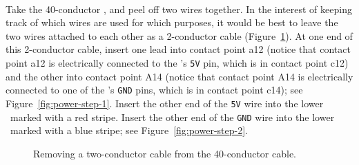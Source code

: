 \disconnect\

Take the 40-conductor \rainbow, and peel off two wires together. In the
interest of keeping track of which wires are used for which purposes, it would
be best to leave the two wires attached to each other as a 2-conductor cable
(Figure~\ref{fig:two-wires}). At one end of this 2-conductor cable, insert one
lead into contact point a12 (notice that contact point a12 is electrically
connected to the \nano's \texttt{5V} pin, which is in contact point c12) and
the other into contact point A14 (notice that contact point A14 is electrically
connected to one of the \nano's \texttt{GND} pins, which is in contact point
c14); see Figure~\ref{fig:power-step-1}. Insert the other end of the
\texttt{5V} wire into the lower \power\ marked with a red stripe. Insert the
other end of the \texttt{GND} wire into the lower \ground\ marked with a blue
stripe; see Figure~\ref{fig:power-step-2}.

\begin{figure}
    \centering
    \hfil
    \caption{Removing a two-conductor cable from the 40-conductor cable.\label{fig:two-wires}}
\end{figure}


